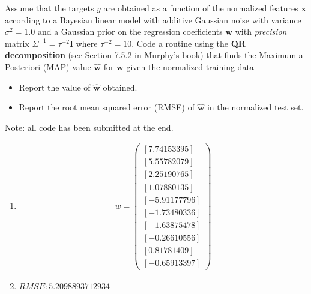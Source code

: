 \documentclass[submit]{harvardml}
\begin{document}
\begin{problem}[7pts]\label{prob:analytic_linear_model}
Assume that the targets $y$ are obtained as a function of the normalized
features $\mathbf{x}$ according to a Bayesian linear model with additive Gaussian noise with variance
$\sigma^2 = 1.0$ and a Gaussian prior on the regression coefficients $\mathbf{w}$
with \textit{precision} matrix $\Sigma^{-1} = \tau^{-2}\mathbf{I}$ where $\tau^{-2} = 10$. Code a routine
using the \textbf{QR decomposition} (see Section 7.5.2 in Murphy's book) that finds the Maximum a
Posteriori (MAP) value $\hat{\mathbf{w}}$ for $\mathbf{w}$ given the normalized
training data
\begin{itemize}
\item Report the value of $\hat{\mathbf{w}}$ obtained.
\item Report the root mean squared error (RMSE) of $\hat{\mathbf{w}}$ in the normalized test set.
\end{itemize}
\vspace{0.1cm}
\end{problem}
Note: all code has been submitted at the end.
\begin{enumerate}[label=(\alph*)]
	\item 
		\begin{align*}
			w = \begin{pmatrix}
			[ 7.74153395] \\
 [ 5.55782079]\\
 [ 2.25190765]\\
 [ 1.07880135]\\
 [-5.91177796]\\
 [-1.73480336]\\
 [-1.63875478]\\
 [-0.26610556]\\
 [ 0.81781409]\\
 [-0.65913397]
			\end{pmatrix}
		\end{align*}
 
	\item $RMSE: 5.2098893712934$
\end{enumerate}
\end{document}
